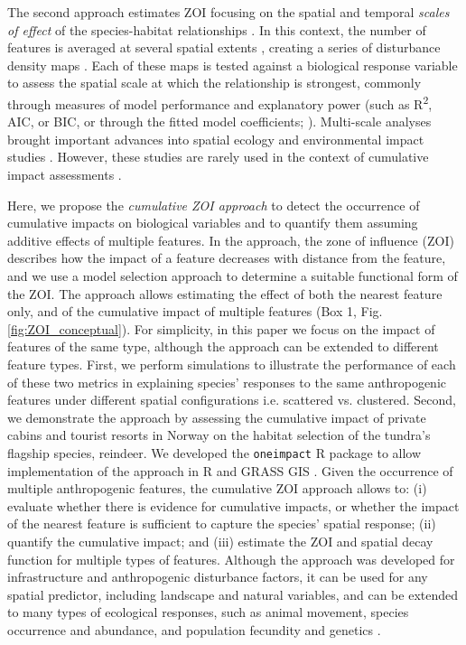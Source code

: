\documentclass[titlepage]{article}
\begin{document}
The second approach estimates ZOI focusing on the spatial and temporal \textit{scales of effect} of the species-habitat relationships \citep[e.g.][]{zeller_multi-level_2017}. In this context, the number of features is averaged at several spatial extents \citep{moraga_scale_2019, laforge_process-focussed_2015}, creating a series of disturbance density maps \citep{mcgarigal_multi-scale_2016}. Each of these maps is tested against a biological response variable to assess the spatial scale at which the relationship is strongest, commonly through measures of model performance and explanatory power (such as R\textsuperscript{2}, AIC, or BIC, or through the fitted model coefficients; \citealt{huais_multifit_2018}).
Multi-scale analyses brought important advances into spatial ecology and environmental impact studies \citep[e.g.][]{mcgarigal_multi-scale_2016}. However, these studies are rarely used in the context of cumulative impact assessments \citep[but see][]{polfus_identifying_2011}.

Here, we propose the \textit{cumulative ZOI approach} to detect the occurrence of cumulative impacts on biological variables and to quantify them assuming additive effects of multiple features. In the approach, the zone of influence (ZOI) describes how the impact of a feature decreases with distance from the feature, and we use a model selection approach to determine a suitable functional form of the ZOI. The approach allows estimating the effect of both the nearest feature only, and of the cumulative impact of multiple features (Box 1, Fig. \ref{fig:ZOI_conceptual}). For simplicity, in this paper we focus on the impact of features of the same type, although the approach can be extended to different feature types. First, we perform simulations to illustrate the performance of each of these two metrics in explaining species’ responses to the same anthropogenic features under different spatial configurations i.e. scattered vs. clustered. Second, we demonstrate the approach by assessing the cumulative impact of private cabins and tourist resorts in Norway on the habitat selection of the tundra’s flagship species, reindeer. We developed the \verb|oneimpact| R package to allow implementation of the approach in R \citep{r_core_team_r_2020} and GRASS GIS \citep{grass_development_team_geographic_2017}. Given the occurrence of multiple anthropogenic features, the cumulative ZOI approach allows to: (i) evaluate whether there is evidence for cumulative impacts, or whether the impact of the nearest feature is sufficient to capture the species’ spatial response; (ii) quantify the cumulative impact; and (iii) estimate the ZOI and spatial decay function for multiple types of features. Although the approach was developed for infrastructure and anthropogenic disturbance factors, it can be used for any spatial predictor, including landscape and natural variables, and can be extended to many types of ecological responses, such as animal movement, species occurrence and abundance, and population fecundity and genetics \citep{panzacchi_predicting_2016, moraga_scale_2019, collevatti_multi-scale_2020}.
\end{document}
